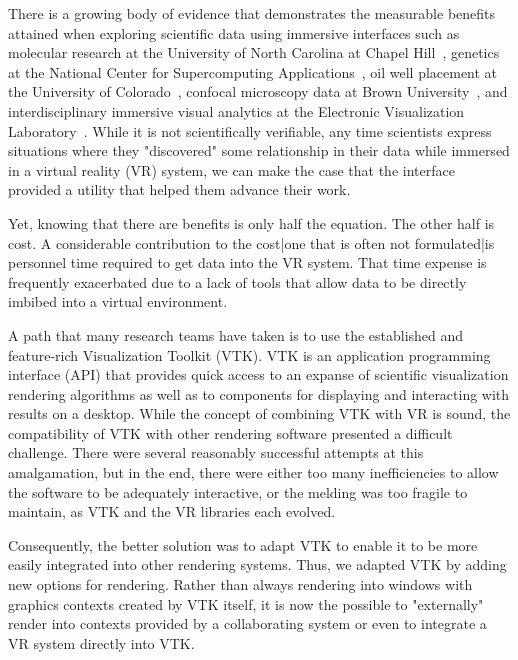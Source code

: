There is a growing body of evidence that demonstrates the measurable benefits
attained when exploring scientific data using immersive interfaces such as
molecular research at the University of North Carolina at Chapel Hill~\cite{Brooks:1990},
genetics at the National Center for Supercomputing Applications~\cite{Brady:1995},
oil well placement at the University of Colorado~\cite{Gruchalla:2004},  confocal microscopy data at Brown University~\cite{Prabhat:2008}, and interdisciplinary immersive visual analytics at the Electronic Visualization Laboratory~\cite{Marai:2016}.
While it is not scientifically verifiable, any time scientists
express situations where they "discovered" some relationship in their data
while immersed in a virtual reality (VR) system, we can make the case that the
interface provided a utility that helped them advance their work.

Yet, knowing that there are benefits is only half the equation.
The other half is cost.
A considerable contribution to the cost|one that is often not
formulated|is personnel time required to get data into the VR system.
That time expense is frequently exacerbated due to a lack of tools that
allow data to be directly imbibed into a virtual environment.

A path that many research teams have taken is to use the established and
feature-rich Visualization Toolkit (VTK).
VTK is an application programming interface (API) that provides quick access to an expanse
of scientific visualization rendering algorithms as well as to components
for displaying and interacting with results on a desktop.
While the concept of combining VTK with VR is sound, the
compatibility of VTK with other rendering software presented a difficult
challenge.  
There were several reasonably successful attempts at this amalgamation,
but in the end, there were either too many inefficiencies to allow the
software to be adequately interactive, or the melding was too fragile to
maintain, as VTK and the VR libraries each evolved.

Consequently, the better solution was to adapt VTK to enable it to be
more easily integrated into other rendering systems.
Thus, we adapted VTK by adding new options for rendering.
Rather than always rendering into windows with graphics contexts
created by VTK itself, it is now the possible to "externally" render
into contexts provided by a collaborating system or even to integrate a
VR system directly into VTK.

